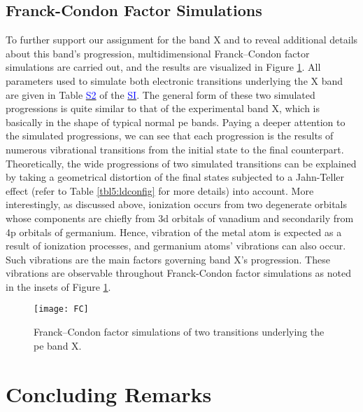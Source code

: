 \begin{refsection}
\subsection{Franck-Condon Factor Simulations}


To further support our assignment for the band X and to reveal additional details about this band’s progression, multidimensional Franck–Condon factor simulations are carried out, and the results are visualized in Figure \ref{fig5:FC}. All parameters used to simulate both electronic transitions underlying the X band are given in Table \href{https://pubs.acs.org/doi/suppl/10.1021/acs.jpca.7b07459/suppl_file/jp7b07459_si_001.pdf}{\textcolor{blue}{S2}} of the \href{https://pubs.acs.org/doi/suppl/10.1021/acs.jpca.7b07459/suppl_file/jp7b07459_si_001.pdf}{\textcolor{blue}{SI}}. The general form of these two simulated progressions is quite similar to that of the experimental band X, which is basically in the shape of typical normal \acrshort{pe} bands. Paying a deeper attention to the simulated progressions, we can see that each progression is the results of numerous vibrational transitions from the initial state to the final counterpart. Theoretically, the wide progressions of two simulated transitions can be explained by taking a geometrical distortion of the final states subjected to a Jahn-Teller effect (refer to Table \ref{tbl5:ldconfig} for more details) into account. More interestingly, as discussed above, ionization occurs from two degenerate orbitals whose components are chiefly from 3d orbitals of vanadium and secondarily from 4p orbitals of germanium. Hence, vibration of the metal atom is expected as a result of ionization processes, and germanium atoms’ vibrations can also occur. Such vibrations are the main factors governing band X’s progression. These vibrations are observable throughout Franck-Condon factor simulations as noted in the insets of Figure \ref{fig5:FC}.




\begin{figure}[htb!]
    \centering
    \texttt{[image: FC]}
    \caption{Franck–Condon factor simulations of two transitions underlying the \acrshort{pe} band X.}
    \label{fig5:FC}
\end{figure} 



\section{Concluding Remarks}




\end{refsection}

